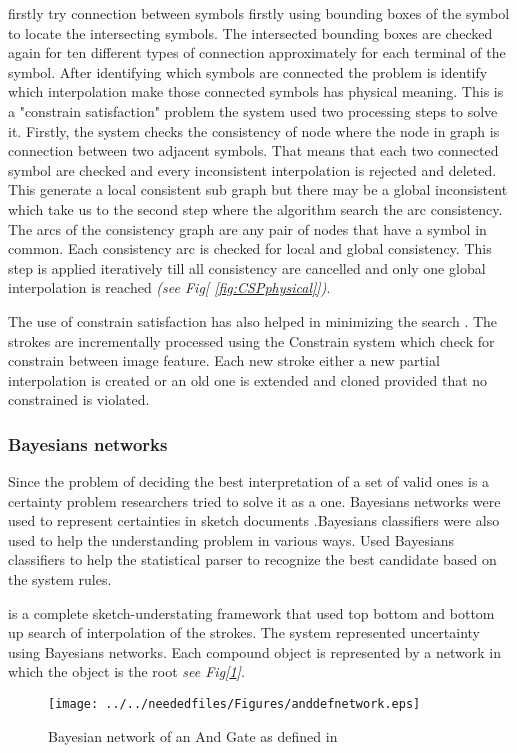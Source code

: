  \cite {physicalmeaning6}  firstly try connection between symbols firstly using bounding boxes of the symbol to locate the intersecting symbols. The intersected bounding boxes are checked again for ten different types of connection approximately for each terminal of the symbol. After identifying which symbols are connected the problem is identify which interpolation make those connected symbols has physical meaning. This is a "constrain satisfaction" problem the system used two processing steps to solve it. Firstly, the system checks the consistency of node where the node in graph is connection between two adjacent symbols. That means that each two connected symbol are checked and every inconsistent interpolation is rejected and deleted. This generate a local consistent sub graph but there may be a global inconsistent which take us to the second step where the algorithm search the arc consistency. The arcs of the consistency graph are any pair of nodes that have a symbol in common.  Each consistency arc is checked for local and global consistency. This step is applied iteratively till all consistency are cancelled and only one global interpolation is reached \textit{(see Fig[ \ref{fig:CSPphysical}])}. 
 
 The use of constrain satisfaction has also helped in minimizing the search \cite {tobeadd} . The strokes are incrementally processed using the Constrain system which check for constrain between image feature. Each new stroke either a new partial interpolation is created or an old one is extended and cloned provided that no constrained is violated. 


\subsubsection{Bayesians networks}
\label{sec:Bayesiansnetworks}


Since the problem of deciding the best interpretation of a set of valid ones is a certainty problem researchers tried to solve it as a one. Bayesians networks were used to represent certainties in sketch documents\cite{SketchRead2007} .Bayesians classifiers were also used to help the understanding problem in various ways.\cite{statisticalparsing26}  Used Bayesians classifiers to help the statistical parser to recognize the best candidate based on the system rules.

\cite{Alvarado2002Framework11,SketchRead2007} is a complete sketch-understating framework that used top bottom and bottom up search of interpolation of the strokes. The system represented uncertainty using Bayesians networks. Each compound object is represented by a network in which the object is the root \textit{see Fig[\ref {fig:anddefnetwork}]}.
 \begin{figure}
		\texttt{[image: ../../neededfiles/Figures/anddefnetwork.eps]}
	\caption[Bayesian network]{Bayesian network of an And Gate as defined in \cite{Alvarado2002Framework11}}
	\label{fig:anddefnetwork}
\end{figure}

